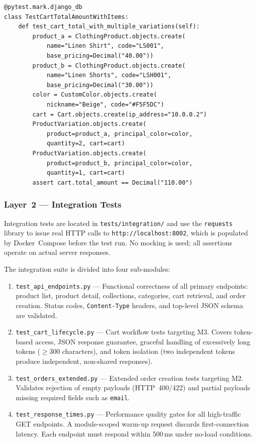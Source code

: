 \documentclass[12pt, a4paper]{article}
\begin{document}
\begin{lstlisting}[caption={Unit test for Cart.total\_amount with multiple variations (tests/unit/test\_product\_model.py).}, label={lst:unit_cart}]
@pytest.mark.django_db
class TestCartTotalAmountWithItems:
    def test_cart_total_with_multiple_variations(self):
        product_a = ClothingProduct.objects.create(
            name="Linen Shirt", code="LS001",
            base_pricing=Decimal("40.00"))
        product_b = ClothingProduct.objects.create(
            name="Linen Shorts", code="LSH001",
            base_pricing=Decimal("30.00"))
        color = CustomColor.objects.create(
            nickname="Beige", code="#F5F5DC")
        cart = Cart.objects.create(ip_address="10.0.0.2")
        ProductVariation.objects.create(
            product=product_a, principal_color=color,
            quantity=2, cart=cart)
        ProductVariation.objects.create(
            product=product_b, principal_color=color,
            quantity=1, cart=cart)
        assert cart.total_amount == Decimal("110.00")
\end{lstlisting}

\subsubsection{Layer~2 — Integration Tests}

Integration tests are located in \texttt{tests/integration/} and use the
\texttt{requests} library to issue real HTTP calls to
\texttt{http://localhost:8002}, which is populated by Docker~Compose before the
test run.  No mocking is used; all assertions operate on actual server
responses.

The integration suite is divided into four sub-modules:

\begin{enumerate}
    \item \texttt{test\_api\_endpoints.py} — Functional correctness of all
    primary endpoints: product list, product detail, collections, categories,
    cart retrieval, and order creation.  Status codes, \texttt{Content-Type}
    headers, and top-level JSON schema are validated.

    \item \texttt{test\_cart\_lifecycle.py} — Cart workflow tests targeting M3.
    Covers token-based access, JSON response guarantee, graceful handling of
    excessively long tokens ($\geq$300 characters), and token isolation (two
    independent tokens produce independent, non-shared responses).

    \item \texttt{test\_orders\_extended.py} — Extended order creation tests
    targeting M2.  Validates rejection of empty payloads (HTTP~400/422) and
    partial payloads missing required fields such as \texttt{email}.

    \item \texttt{test\_response\_times.py} — Performance quality gates for
    all high-traffic GET endpoints.  A module-scoped warm-up request discards
    first-connection latency.  Each endpoint must respond within 500\,ms under
    no-load conditions.
\end{enumerate}
\end{document}
